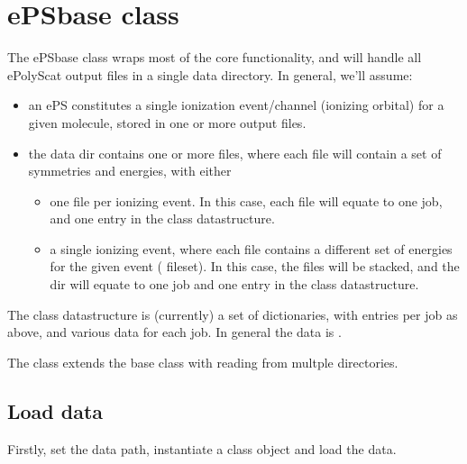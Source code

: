 \documentclass[letterpaper,10pt,english]{jupyterBook}
\begin{document}
\section{ePSbase class}
\label{\detokenize{testChpt/ePSproc_class_demo_161020:epsbase-class}}
\sphinxAtStartPar
The ePSbase class wraps most of the core functionality, and will handle all ePolyScat output files in a single data directory. In general, we’ll assume:
\begin{itemize}
\item {} 
\sphinxAtStartPar
an ePS  constitutes a single ionization event/channel (ionizing orbital) for a given molecule, stored in one or more output files.

\item {} 
\sphinxAtStartPar
the data dir contains one or more files, where each file will contain a set of symmetries and energies, with either
\begin{itemize}
\item {} 
\sphinxAtStartPar
one file per ionizing event. In this case, each file will equate to one job, and one entry in the class datastructure.

\item {} 
\sphinxAtStartPar
a single ionizing event, where each file contains a different set of energies for the given event ( fileset). In this case, the files will be stacked, and the dir will equate to one job and one entry in the class datastructure.

\end{itemize}

\end{itemize}

\sphinxAtStartPar
The class datastructure is (currently) a set of dictionaries, with entries per job as above, and various data for each job. In general the data is .

\sphinxAtStartPar
The  class extends the base class with reading from multple directories.


\subsection{Load data}
\label{\detokenize{testChpt/ePSproc_class_demo_161020:load-data}}
\sphinxAtStartPar
Firstly, set the data path, instantiate a class object and load the data.
\end{document}
